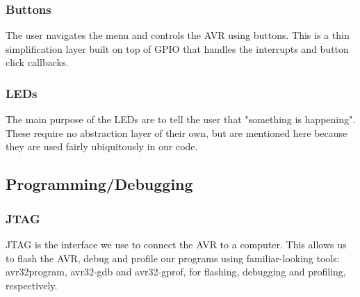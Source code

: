 \subsubsection{Buttons}
The user navigates the menu and controls the AVR using buttons. This is
a thin simplification layer built on top of GPIO that handles the
interrupts and button click callbacks. 

\subsubsection{LEDs}
The main purpose of the LEDs are to tell the user that "something is
happening". These require no abstraction layer of their own, but are
mentioned here because they are used fairly ubiquitously in our code.

\subsection{Programming/Debugging}
\subsubsection{JTAG}
JTAG is the interface we use to connect the AVR to a computer. This
allows us to flash the AVR, debug and profile our programs using
familiar-looking tools: avr32program, avr32-gdb and avr32-gprof,
for flashing, debugging and profiling, respectively.

